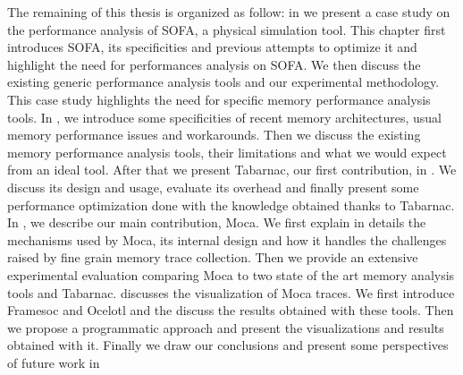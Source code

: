The remaining of this thesis is organized as follow:
in  we present a case study on the performance analysis of \gls{SOFA}, a physical simulation tool.
This chapter first introduces \gls{SOFA}, its specificities and previous attempts to optimize it and highlight the need for performances analysis on \gls{SOFA}.
We then discuss the existing generic performance analysis tools and our experimental methodology.
This case study highlights the need for specific memory performance analysis tools.
In , we introduce some specificities of recent memory architectures, usual memory performance issues and workarounds.
Then we discuss the existing memory performance analysis tools, their limitations and what we would expect from an ideal tool.
After that we present \gls{Tabarnac}, our first contribution, in .
We discuss its design and usage, evaluate its overhead and finally present some performance optimization done with the knowledge obtained thanks to \gls{Tabarnac}.
In , we describe our main contribution, \gls{Moca}.
We first explain in details the mechanisms used by \gls{Moca}, its internal design and how it handles the challenges raised by fine grain memory trace collection.
Then we provide an extensive experimental evaluation comparing \gls{Moca} to two state of the art memory analysis tools and \gls{Tabarnac}.
 discusses the visualization of \gls{Moca} traces.
We first introduce \gls{Framesoc} and \gls{Ocelotl} and the discuss the results obtained with these tools.
Then we propose a programmatic approach and present the visualizations and results obtained with it.
Finally we draw our conclusions and present some perspectives of future work in 
